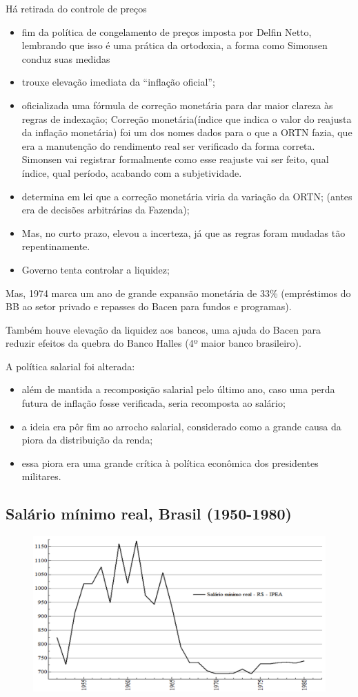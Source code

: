 \documentclass[a4paper,12pt]{article}[abntex2]
\begin{document}
Há retirada do controle de preços \begin{itemize}
    \item fim da política de congelamento de preços imposta por Delfin Netto, lembrando que isso é uma prática da ortodoxia, a forma como Simonsen conduz suas medidas
    \item trouxe elevação imediata da “inflação oficial”; 
    \item oficializada uma fórmula de correção monetária para dar maior clareza às regras de indexação; Correção monetária(índice que indica o valor do reajusta da inflação monetária) foi um dos nomes dados para o que a ORTN fazia, que era a manutenção do rendimento real ser verificado da forma correta. Simonsen vai registrar formalmente como esse reajuste vai ser feito, qual índice, qual período, acabando com a subjetividade.
    \item determina em lei que a correção monetária viria da variação da ORTN; (antes era de decisões arbitrárias da Fazenda);
    \item Mas, no curto prazo, elevou a incerteza, já que as regras foram mudadas tão repentinamente.
    \item Governo tenta controlar a liquidez;
\end{itemize}

Mas, 1974 marca um ano de grande expansão monetária de 33\% (empréstimos do BB ao setor privado e repasses do Bacen para fundos e programas). 

Também houve elevação da liquidez aos bancos, uma ajuda do Bacen para reduzir efeitos da quebra do Banco Halles (4º maior banco brasileiro).

A política salarial foi alterada: \begin{itemize}
    \item além de mantida a recomposição salarial pelo último ano, caso uma perda futura de inflação fosse verificada, seria recomposta ao salário;
    \item a ideia era pôr fim ao arrocho salarial, considerado como a grande causa da piora da distribuição da renda;
    \item essa piora era uma grande crítica à política econômica dos presidentes militares.
\end{itemize}

\subsection{\textbf{Salário mínimo real, Brasil (1950-1980)}}
\begin{figure}[H]
    \centering
    \includegraphics[width=0.7\linewidth]{Imagens/a6i3.png}
\end{figure}
\end{document}
